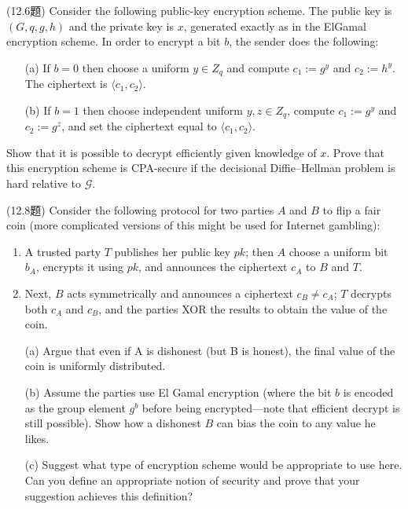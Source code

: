 \begin{questions}
    \question (12.6题) Consider the following public-key encryption scheme. The public key is $(G,q,g,h)$ and the private key is $x$, generated exactly as in the ElGamal encryption scheme. In order to encrypt a bit $b$, the sender does the following:

        \begin{enumerate}
            \item[(a)] If $b=0$ then choose a uniform $y\in{Z_q}$ and compute $c_1:=g^y$ and $c_2:=h^y$. The ciphertext is $\langle{c_1,c_2}\rangle$.
            \item[(b)] If $b=1$ then choose independent uniform $y,z\in{Z_q}$, compute $c_1:=g^y$ and $c_2:=g^z$, and set the ciphertext equal to $\langle{c_1,c_2}\rangle$.
        \end{enumerate}

        Show that it is possible to decrypt efficiently given knowledge of $x$. Prove that this encryption scheme is CPA-secure if the decisional Diffie–Hellman problem is hard relative to $\mathcal{G}$.

        \begin{solution}
        \end{solution}

    \question (12.8题) Consider the following protocol for two parties $A$ and $B$ to flip a fair coin (more complicated versions of this might be used for Internet gambling):

        \begin{enumerate}
            \item A trusted party $T$ publishes her public key $pk$; then $A$ choose a uniform bit $b_A$, encrypts it using $pk$, and announces the ciphertext $c_A$ to $B$ and $T$.
            \item Next, $B$ acts symmetrically and announces a ciphertext $c_B\neq{c_A}$; $T$ decrypts both $c_A$ and $c_B$, and the parties XOR the results to obtain the value of the coin.
        \end{enumerate}

        \begin{enumerate}
            \item[(a)] Argue that even if A is dishonest (but B is honest), the final value of the coin is uniformly distributed.
            \item[(b)] Assume the parties use El Gamal encryption (where the bit $b$ is encoded as the group element $g^b$ before being encrypted—note that efficient decrypt is still possible). Show how a dishonest $B$ can bias the coin to any value he likes.
            \item[(c)] Suggest what type of encryption scheme would be appropriate to use here. Can you define an appropriate notion of security and prove that your suggestion achieves this definition?
        \end{enumerate}


\end{questions}
